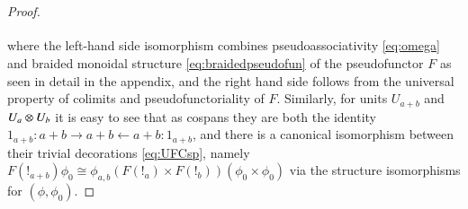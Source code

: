 \documentclass[reqno]{amsart}
\begin{document}
\begin{proof}
\begin{equation}
{\begin{tikzcd}[ampersand replacement=\&,column sep=.3in,row sep=.1in]
\end{tikzcd}}
\end{equation}
where the left-hand side isomorphism combines pseudoassociativity \cref{eq:omega} and braided monoidal structure \cref{eq:braidedpseudofun} of the pseudofunctor $F$ as seen in detail in the appendix, and the right hand side follows from the universal property of colimits and pseudofunctoriality of $F$.
Similarly, for units $U_{a+b}$ and $U_a\otimes U_b$ it is easy to see that as cospans they are both the identity $1_{a+b}:a+b\to a+b\leftarrow a+b:1_{a+b}$, and there is a canonical isomorphism between their trivial decorations \cref{eq:UFCsp}, namely $F(!_{a+b})\phi_0\cong\phi_{a,b}(F(!_a)\times F(!_b))(\phi_0\times\phi_0)$ via the structure isomorphisms for $(\phi,\phi_0)$.
\begin{comment}
, the first of which relates the double functor $\otimes$ with the functor $\odot$ and the second of which relates the double functor $\otimes$ with the functor $U$. 
The latter of these is easy to see: given two objects $a$ and $b$ in $F\lCsp_0=\A$, $\mu$ is given by the identity map of cospans in $\A$:
\[
\begin{tikzpicture}[scale=1.5]
\node (A) at (0,0.5) {$a+b$};
\node (A') at (0,-0.5) {$a+b$};
\node (B) at (2,0.5) {$a+b$};
\node (C) at (4,0.5) {$a+b$};
\node (C') at (4,-0.5) {$a+b$};
\node (D) at (2,-0.5) {$a+b$};
\node (E) at (5.5,0.5) {$\bot_{a+b} \in F(a+b)$};
\node (F) at (5.5,-0.5) {$\bot_a + \bot_b \in F(a+b)$};
\path[->,font=\scriptsize,>=angle 90]
(A) edge node[above]{$1_{a+b}$} (B)
(C) edge node[above]{$1_{a+b}$} (B)
(A) edge node[left]{$1$} (A')
(C) edge node[right]{$1$} (C')
(A') edge node [above]{$1_a + 1_b$} (D)
(C') edge node [above]{$1_a + 1_b$} (D)
(B) edge node [left] {$1$} (D);
\end{tikzpicture}
\]
together with the decoration isomorphism $\tau_{a,b} \maps \bot_{a+b} \xrightarrow{\sim} \bot_a + \bot_b$ given by the unique map between the two initial objects $\bot_{a+b}$ and $\bot_a + \bot_b$ in $F(a+b)$. 
For the former globular 2-morphism $\chi$, we first introduce some notation for objects $M_1,M_2,N_1$ and $N_2$ of $F\lCsp_1$:
\[
\begin{tikzpicture}[scale=1.5]
\node (A) at (0,0) {$a$};
\node (B) at (1,0) {$m_1$};
\node (C) at (2,0) {$b$};
\node (D) at (1,-0.5) {$x_1 \in F(m_1)$};

\end{comment}
\end{proof}
\end{document}
